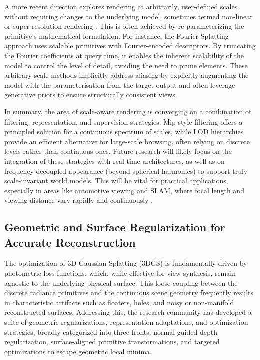 \documentclass[11pt,a4paper]{article}
\begin{document}
A more recent direction explores rendering at arbitrarily, user-defined scales without requiring changes to the underlying model, sometimes termed non-linear or super-resolution rendering \cite{arxiv:2402.07181v1}. This is often achieved by re-parameterizing the primitive's mathematical formulation. For instance, the Fourier Splatting approach \cite{arxiv:2603.18707v1} uses scalable primitives with Fourier-encoded descriptors. By truncating the Fourier coefficients at query time, it enables the inherent scalability of the model to control the level of detail, avoiding the need to prune elements. These arbitrary-scale methods implicitly address aliasing by explicitly augmenting the model with the parameterisation from the target output and often leverage generative priors to ensure structurally consistent views.

In summary, the area of scale-aware rendering is converging on a combination of filtering, representation, and supervision strategies. Mip-style filtering offers a principled solution for a continuous spectrum of scales, while LOD hierarchies provide an efficient alternative for large-scale browsing, often relying on discrete levels rather than continuous ones. Future research will likely focus on the integration of these strategies with real-time architectures, as well as on frequency-decoupled appearance (beyond spherical harmonics) to support truly scale-invariant world models. This will be vital for practical applications, especially in areas like automotive viewing and SLAM, where focal length and viewing distance vary rapidly and continuously \cite{arxiv:2502.19318v1,arxiv:2403.19632v1}.


\subsection{Geometric and Surface Regularization for Accurate Reconstruction}


The optimization of 3D Gaussian Splatting (3DGS) is fundamentally driven by photometric loss functions, which, while effective for view synthesis, remain agnostic to the underlying physical surface. This loose coupling between the discrete radiance primitives and the continuous scene geometry frequently results in characteristic artifacts such as floaters, holes, and noisy or non-manifold reconstructed surfaces. Addressing this, the research community has developed a suite of geometric regularizations, representation adaptations, and optimization strategies, broadly categorized into three fronts: normal-guided depth regularization, surface-aligned primitive transformations, and targeted optimizations to escape geometric local minima.
\end{document}
